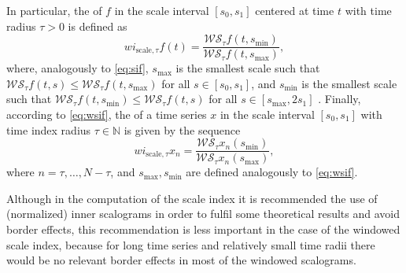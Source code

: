 In particular, the  of $f$ in the scale interval $[s_0,s_1]$ centered at time $t$ with time radius $\tau >0$ is defined as
\begin{equation}
\label{eq:wsif}
wi_{\textrm{scale},\tau }f(t) = \frac{\mathcal{WS}_{\tau }f\left( t,s_{\textrm{min}}\right) }{\mathcal{WS}_{\tau }f\left( t,s_{\textrm{max}}\right) },
\end{equation}
where, analogously to \eqref{eq:sif}, $s_{\textrm{max}}$ is the smallest scale such that $\mathcal{WS}_{\tau }f(t,s)\leq \mathcal{WS}_{\tau }f\left( t,s_{\textrm{max}}\right) $ for all $s\in [s_0,s_1]$, and $s_{\textrm{min}}$ is the smallest scale such that $\mathcal{WS} _{\tau }f\left( t,s _{\textrm{min}}\right) \leq \mathcal{WS} _{\tau}f(t,s)$ for all $s \in \left[ s _{\textrm{max}}, 2s_1 \right] $ \citep{bol20}. Finally, according to \eqref{eq:wsif}, the  of a time series $x$ in the scale interval $[s_0,s_1]$ with time index radius $\tau \in \mathbb{N}$ is given by the sequence
\[
wi_{\textrm{scale},\tau }x_n = \frac{\mathcal{WS}_{\tau }x_n\left(s_{\textrm{min}}\right) }{\mathcal{WS}_{\tau }x_n\left(s_{\textrm{max}}\right) },
\]
where $n=\tau ,\ldots ,N-\tau $, and $s_{\textrm{max}},s_{\textrm{min}}$ are defined analogously to \eqref{eq:wsif}.

\begin{rmk}
Although in the computation of the scale index it is recommended the use of (normalized) inner scalograms in order to fulfil some theoretical results and avoid border effects, this recommendation is less important in the case of the windowed scale index, because for long time series and relatively small time radii there would be no relevant border effects in most of the windowed scalograms.
\end{rmk}

